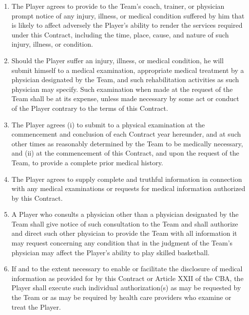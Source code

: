 \documentclass[
]{book}
\begin{document}
\begin{enumerate}
\item
  The Player agrees to provide to the Team's coach, trainer, or physician prompt notice of any injury, illness, or medical condition suffered by him that is likely to affect adversely the Player's ability to render the services required under this Contract, including the time, place, cause, and nature of such injury, illness, or condition.
\item
  Should the Player suffer an injury, illness, or medical condition, he will submit himself to a medical examination, appropriate medical treatment by a physician designated by the Team, and such rehabilitation activities as such physician may specify. Such examination when made at the request of the Team shall be at its expense, unless made necessary by some act or conduct of the Player contrary to the terms of this Contract.
\item
  The Player agrees (i) to submit to a physical examination at the commencement and conclusion of each Contract year hereunder, and at such other times as reasonably determined by the Team to be medically necessary, and (ii) at the commencement of this Contract, and upon the request of the Team, to provide a complete prior medical history.
\item
  The Player agrees to supply complete and truthful information in connection with any medical examinations or requests for medical information authorized by this Contract.
\item
  A Player who consults a physician other than a physician designated by the Team shall give notice of such consultation to the Team and shall authorize and direct such other physician to provide the Team with all information it may request concerning any condition that in the judgment of the Team's physician may affect the Player's ability to play skilled basketball.
\item
  If and to the extent necessary to enable or facilitate the disclosure of medical information as provided for by this Contract or Article XXII of the CBA, the Player shall execute such individual authorization(s) as may be requested by the Team or as may be required by health care providers who examine or treat the Player.
\end{enumerate}
\end{document}
